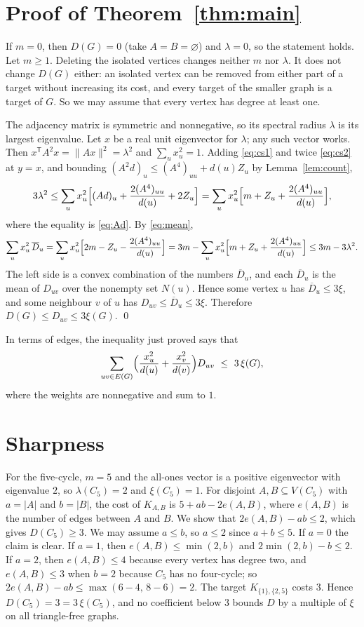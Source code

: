 \documentclass[11pt]{article}
\theoremstyle{remark}
\newcommand{\Dcost}{D}
\begin{document}
\section{Proof of Theorem~\ref{thm:main}}\label{sec:proof}

If $m=0$, then $D(G)=0$ (take $A=B=\varnothing$) and $\lambda=0$, so the statement holds. Let
$m\ge1$. Deleting the isolated vertices changes neither $m$ nor $\lambda$. It does not change
$D(G)$ either: an isolated vertex can be removed from either part of a target without increasing
its cost, and every target of the smaller graph is a target of $G$. So we may assume that every
vertex has degree at least one.

The adjacency matrix is symmetric and nonnegative, so its spectral radius $\lambda$ is its
largest eigenvalue. Let $x$ be a real unit eigenvector for $\lambda$; any such vector works. Then
$x^{\mathsf T}A^2x=\|Ax\|^2=\lambda^2$ and $\sum_ux_u^2=1$. Adding \eqref{eq:cs1} and twice
\eqref{eq:cs2} at $y=x$, and bounding $(A^2d)_u\le(A^4)_{uu}+d(u)Z_u$ by Lemma~\ref{lem:count},
\[
  3\lambda^2\le\sum_ux_u^2\Bigl[(Ad)_u+\frac{2(A^4)_{uu}}{d(u)}+2Z_u\Bigr]
  =\sum_ux_u^2\Bigl[m+Z_u+\frac{2(A^4)_{uu}}{d(u)}\Bigr],
\]
where the equality is \eqref{eq:Ad}. By \eqref{eq:mean},
\[
  \sum_ux_u^2\,\overline\Dcost_u
  =\sum_ux_u^2\Bigl[2m-Z_u-\frac{2(A^4)_{uu}}{d(u)}\Bigr]
  =3m-\sum_ux_u^2\Bigl[m+Z_u+\frac{2(A^4)_{uu}}{d(u)}\Bigr]
  \le3m-3\lambda^2 .
\]
The left side is a convex combination of the numbers $\overline\Dcost_u$, and each
$\overline\Dcost_u$ is the mean of $\Dcost_{uv}$ over the nonempty set $N(u)$. Hence some vertex
$u$ has $\overline\Dcost_u\le3\xi$, and some neighbour $v$ of $u$ has
$\Dcost_{uv}\le\overline\Dcost_u\le3\xi$. Therefore $D(G)\le\Dcost_{uv}\le3\xi(G)$. \qed

\medskip
In terms of edges, the inequality just proved says that
\[
  \sum_{uv\in E(G)}\Bigl(\frac{x_u^2}{d(u)}+\frac{x_v^2}{d(v)}\Bigr)\Dcost_{uv}\ \le\ 3\,\xi(G),
\]
where the weights are nonnegative and sum to $1$.

\section{Sharpness}\label{sec:sharp}

For the five-cycle, $m=5$ and the all-ones vector is a positive eigenvector with eigenvalue $2$,
so $\lambda(C_5)=2$ and $\xi(C_5)=1$. For disjoint $A,B\subseteq V(C_5)$ with $a=|A|$ and
$b=|B|$, the cost of $K_{A,B}$ is $5+ab-2e(A,B)$, where $e(A,B)$ is the number of edges between
$A$ and $B$. We show that $2e(A,B)-ab\le2$, which gives $D(C_5)\ge3$. We may assume $a\le b$, so
$a\le2$ since $a+b\le5$. If $a=0$ the claim is clear. If $a=1$, then $e(A,B)\le\min(2,b)$ and
$2\min(2,b)-b\le2$. If $a=2$, then $e(A,B)\le4$ because every vertex has degree two, and
$e(A,B)\le3$ when $b=2$ because $C_5$ has no four-cycle; so $2e(A,B)-ab\le\max(6-4,\,8-6)=2$.
The target $K_{\{1\},\{2,5\}}$ costs $3$. Hence $D(C_5)=3=3\,\xi(C_5)$, and no coefficient below
$3$ bounds $D$ by a multiple of $\xi$ on all triangle-free graphs.
\end{document}
